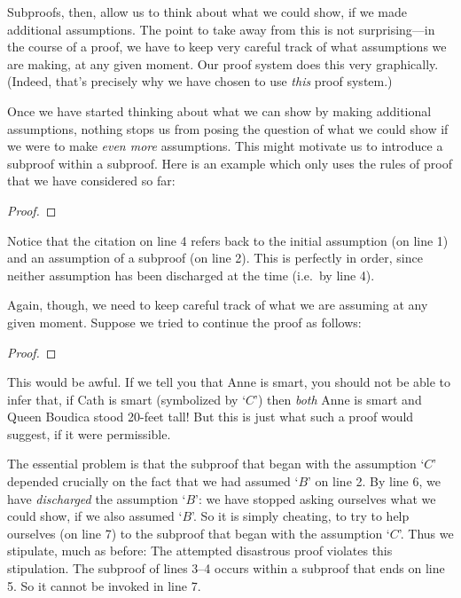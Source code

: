 Subproofs, then, allow us to think about what we could show, if we made additional assumptions. The point to take away from this is not surprising---in the course of a proof, we have to keep very careful track of what assumptions we are making, at any given moment. Our proof system does this very graphically. (Indeed, that's precisely why we have chosen to use \emph{this} proof system.)

Once we have started thinking about what we can show by making additional assumptions, nothing stops us from posing the question of what we could show if we were to make \emph{even more} assumptions. This might motivate us to introduce a subproof within a subproof. Here is an example which only uses the rules of proof that we have considered so far:
\begin{proof}
\open
	\open
	\close
\close
{}
\end{proof}
Notice that the citation on line 4 refers back to the initial assumption (on line 1) and an assumption of a subproof (on line 2). This is perfectly in order, since neither assumption has been discharged at the time (i.e.\ by line 4).

Again, though, we need to keep careful track of what we are assuming at any given moment. Suppose we tried to continue the proof as follows:
\begin{proof}
\open
	\open
	\close
\close
{}
\end{proof}
This would be awful. If we tell you that Anne is smart, you should not be able to infer that, if Cath is smart (symbolized by `$C$') then \emph{both} Anne is smart and Queen Boudica stood 20-feet tall! But this is just what such a proof would suggest, if it were permissible.

The essential problem is that the subproof that began with the assumption `$C$' depended crucially on the fact that we had assumed `$B$' on line 2. By line 6, we have \emph{discharged} the assumption `$B$': we have stopped asking ourselves what we could show, if we also assumed `$B$'. So it is simply cheating, to try to help ourselves (on line 7) to the subproof that began with the assumption `$C$'. Thus we stipulate, much as before:
The attempted disastrous proof violates this stipulation. The subproof of lines 3--4 occurs within a subproof that ends on line 5. So it cannot be invoked in line 7.

